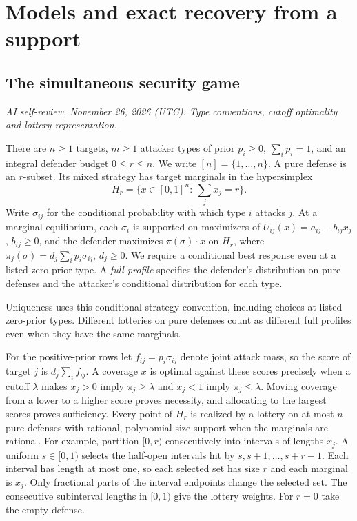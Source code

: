 \documentclass[11pt,oneside,openany,notitlepage]{report}
\newcommand{\reviewdate}{November 26, 2026 (UTC)}
\newcommand{\reviewmark}[1]{\par\nopagebreak[4]\noindent
  {\footnotesize\itshape AI self-review, \reviewdate. #1\par}\nobreak\smallskip}
\begin{document}
\chapter{Models and exact recovery from a support}\label{sec:models}


\section{The simultaneous security game}
\reviewmark{Type conventions, cutoff optimality and lottery representation.}
There are \(n\ge1\) targets, \(m\ge1\) attacker types of prior
\(p_i\ge0\), \(\sum_i p_i=1\), and an integral defender budget \(0\le r\le n\).
We write \([n]=\{1,\ldots,n\}\).
A pure defense is an \(r\)-subset. Its mixed strategy has target marginals
in the hypersimplex
\[
 H_r=\{x\in[0,1]^n:\ \textstyle\sum_jx_j=r\}.
\]
Write \(\sigma_{ij}\) for the conditional probability with which type \(i\)
attacks \(j\). At a marginal equilibrium, each \(\sigma_i\) is supported on
maximizers of \(U_{ij}(x)=a_{ij}-b_{ij}x_j\), \(b_{ij}\ge0\), and the
defender maximizes \(\pi(\sigma)\cdot x\) on \(H_r\), where
\(\pi_j(\sigma)=d_j\sum_i p_i\sigma_{ij}\), \(d_j\ge0\). We require a
conditional best response even at a listed zero-prior type. A \emph{full
profile} specifies the defender's distribution on pure defenses and the
attacker's conditional distribution for each type.

Uniqueness uses this conditional-strategy convention, including choices
at listed zero-prior types. Different lotteries on pure defenses count
as different full profiles even when they have the same marginals.

For the positive-prior rows let \(f_{ij}=p_i\sigma_{ij}\) denote joint
attack mass, so the score of target \(j\) is \(d_j\sum_i f_{ij}\).
A coverage \(x\) is optimal against these scores precisely when a cutoff
\(\lambda\) makes \(x_j>0\) imply \(\pi_j\ge\lambda\) and \(x_j<1\)
imply \(\pi_j\le\lambda\). Moving coverage from a lower to a higher
score proves necessity, and allocating to the largest scores proves
sufficiency. Every point of \(H_r\) is realized by a lottery on at most
\(n\) pure defenses with rational, polynomial-size support when the
marginals are rational. For example, partition \([0,r)\) consecutively
into intervals of lengths \(x_j\). A uniform \(s\in[0,1)\) selects the
half-open intervals hit by \(s,s+1,\ldots,s+r-1\). Each interval has
length at most one, so each selected set has size \(r\) and each marginal is \(x_j\).
Only fractional parts of the interval endpoints change the selected set.
The consecutive subinterval lengths in \([0,1)\) give the lottery weights.
For \(r=0\) take the empty defense.
\end{document}
